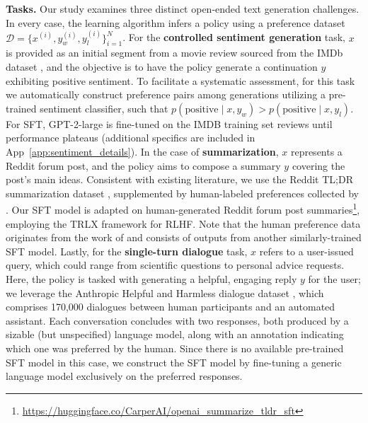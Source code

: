 \textbf{Tasks.} Our study examines three distinct open-ended text generation challenges. In every case, the learning algorithm infers a policy using a preference dataset $\mathcal{D}=\bigl\{x^{(i)}, y_w^{(i)}, y_l^{(i)}\bigr\}_{i=1}^N$. For the \textbf{controlled sentiment generation} task, $x$ is provided as an initial segment from a movie review sourced from the IMDb dataset \cite{maas-EtAl:2011:ACL-HLT2011}, and the objective is to have the policy generate a continuation $y$ exhibiting positive sentiment. To facilitate a systematic assessment, for this task we automatically construct preference pairs among generations utilizing a pre-trained sentiment classifier, such that $p(\text{positive}\mid x,y_w)>p(\text{positive}\mid x,y_l)$. For SFT, GPT-2-large is fine-tuned on the IMDB training set reviews until performance plateaus (additional specifics are included in App~\ref{app:sentiment_details}). In the case of \textbf{summarization}, $x$ represents a Reddit forum post, and the policy aims to compose a summary $y$ covering the post’s main ideas. Consistent with existing literature, we use the Reddit TL;DR summarization dataset \citep{volske-etal-2017-tl}, supplemented by human-labeled preferences collected by \citeauthor{stiennon2022learning}. Our SFT model is adapted on human-generated Reddit forum post summaries\footnote{\url{https://huggingface.co/CarperAI/openai_summarize_tldr_sft}}, employing the TRLX framework \citep{leandro_von_werra_2023_7790115} for RLHF. Note that the human preference data originates from the work of \citeauthor{stiennon2022learning} and consists of outputs from another similarly-trained SFT model. Lastly, for the \textbf{single-turn dialogue} task, $x$ refers to a user-issued query, which could range from scientific questions to personal advice requests. Here, the policy is tasked with generating a helpful, engaging reply $y$ for the user; we leverage the Anthropic Helpful and Harmless dialogue dataset \citep{bai2022training}, which comprises 170,000 dialogues between human participants and an automated assistant. Each conversation concludes with two responses, both produced by a sizable (but unspecified) language model, along with an annotation indicating which one was preferred by the human. Since there is no available pre-trained SFT model in this case, we construct the SFT model by fine-tuning a generic language model exclusively on the preferred responses.


